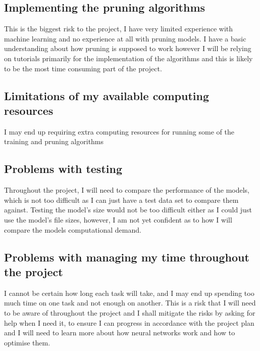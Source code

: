 \documentclass{article}
\begin{document}
\subsection{Implementing the pruning algorithms}
This is the biggest risk to the project, I have very limited experience with machine learning and no experience at all with pruning models. I have a basic understanding about how pruning is supposed to work however I will be relying on tutorials primarily for the implementation of the algorithms and this is likely to be the most time consuming part of the project.

\subsection{Limitations of my available computing resources}
I may end up requiring extra computing resources for running some of the training and pruning algorithms 

\subsection{Problems with testing}
Throughout the project, I will need to compare the performance of the models, which is not too difficult as I can just have a test data set to compare them against. Testing the model's size would not be too difficult either as I could just use the model's file sizes, however, I am not yet confident as to how I will compare the models computational demand.

\subsection{Problems with managing my time throughout the project}
I cannot be certain how long each task will take, and I may end up spending too much time on one task and not enough on another.
This is a risk that I will need to be aware of throughout the project and I shall mitigate the risks by asking for help when I need it, to ensure I can progress in accordance with the project plan and I will need to learn more about how neural networks work 
and how to optimise them.

\pagebreak


\lipsum[1]\lipsum[2]
\end{document}
